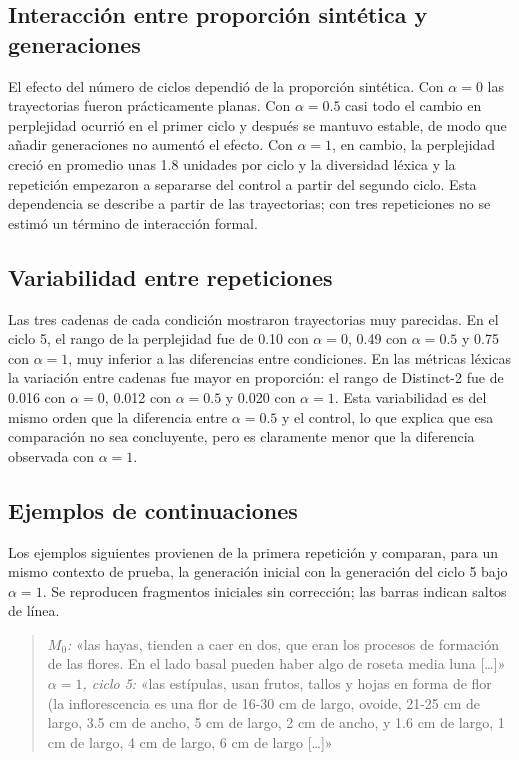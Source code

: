\documentclass[12pt,letterpaper]{article}
\begin{document}
\subsection{Interacción entre proporción sintética y generaciones}

El efecto del número de ciclos dependió de la proporción sintética. Con
\(\alpha=0\) las trayectorias fueron prácticamente planas. Con
\(\alpha=0.5\) casi todo el cambio en perplejidad ocurrió en el primer
ciclo y después se mantuvo estable, de modo que añadir generaciones no
aumentó el efecto. Con \(\alpha=1\), en cambio, la perplejidad creció en
promedio unas 1.8 unidades por ciclo y la diversidad léxica y la
repetición empezaron a separarse del control a partir del segundo ciclo.
Esta dependencia se describe a partir de las trayectorias; con tres
repeticiones no se estimó un término de interacción formal.

\subsection{Variabilidad entre repeticiones}

Las tres cadenas de cada condición mostraron trayectorias muy parecidas.
En el ciclo 5, el rango de la perplejidad fue de 0.10 con \(\alpha=0\),
0.49 con \(\alpha=0.5\) y 0.75 con \(\alpha=1\), muy inferior a las
diferencias entre condiciones. En las métricas léxicas la variación entre
cadenas fue mayor en proporción: el rango de Distinct-2 fue de 0.016 con
\(\alpha=0\), 0.012 con \(\alpha=0.5\) y 0.020 con \(\alpha=1\). Esta
variabilidad es del mismo orden que la diferencia entre \(\alpha=0.5\) y
el control, lo que explica que esa comparación no sea concluyente, pero es
claramente menor que la diferencia observada con \(\alpha=1\).

\subsection{Ejemplos de continuaciones}

Los ejemplos siguientes provienen de la primera repetición y comparan, para
un mismo contexto de prueba, la generación inicial con la generación del
ciclo 5 bajo \(\alpha=1\). Se reproducen fragmentos iniciales sin
corrección; las barras indican saltos de línea.

\begin{quote}\small
\textit{\(M_0\):} «las hayas, tienden a caer en dos, que eran los procesos
de formación de las flores. En el lado basal pueden haber algo de roseta
media luna [\ldots]»\\[0.3em]
\textit{\(\alpha=1\), ciclo 5:} «las estípulas, usan frutos, tallos y hojas
en forma de flor (la inflorescencia es una flor de 16-30 cm de largo,
ovoide, 21-25 cm de largo, 3.5 cm de ancho, 5 cm de largo, 2 cm de ancho,
y 1.6 cm de largo, 1 cm de largo, 4 cm de largo, 6 cm de largo [\ldots]»
\end{quote}
\end{document}

